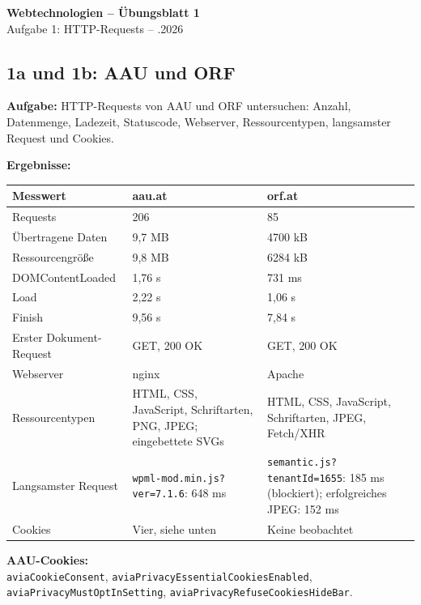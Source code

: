 \documentclass[10pt,a4paper]{article}
\begin{document}
\begin{center}
  {\Large\textbf{Webtechnologien -- Übungsblatt 1}}\\[4pt]
  Aufgabe 1: HTTP-Requests \quad -- .2026
\end{center}

\subsection*{1a und 1b: AAU und ORF}
\textbf{Aufgabe:} HTTP-Requests von AAU und ORF untersuchen:
Anzahl, Datenmenge, Ladezeit, Statuscode, Webserver, Ressourcentypen,
langsamster Request und Cookies.

\textbf{Ergebnisse:}

\begin{center}
\begin{tabular}{|p{4.1cm}|p{5.5cm}|p{5.5cm}|}
\hline
\textbf{Messwert} & \textbf{aau.at} & \textbf{orf.at} \\ \hline
Requests & 206 & 85 \\ \hline
Übertragene Daten & 9,7 MB & 4700 kB \\ \hline
Ressourcengröße & 9,8 MB & 6284 kB \\ \hline
DOMContentLoaded & 1,76 s & 731 ms \\ \hline
Load & 2,22 s & 1,06 s \\ \hline
Finish & 9,56 s & 7,84 s \\ \hline
Erster Dokument-Request & GET, 200 OK & GET, 200 OK \\ \hline
Webserver & nginx & Apache \\ \hline
Ressourcentypen & HTML, CSS, JavaScript, Schriftarten, PNG, JPEG; eingebettete SVGs & HTML, CSS, JavaScript, Schriftarten, JPEG, Fetch/XHR \\ \hline
Langsamster Request & \nolinkurl{wpml-mod.min.js?ver=7.1.6}: 648 ms & \nolinkurl{semantic.js?tenantId=1655}: 185 ms (blockiert); erfolgreiches JPEG: 152 ms \\ \hline
Cookies & Vier, siehe unten & Keine beobachtet \\ \hline
\end{tabular}
\end{center}

\textbf{AAU-Cookies:}\\
\texttt{aviaCookieConsent},
\texttt{aviaPrivacyEssentialCookiesEnabled},\\
\texttt{aviaPrivacyMustOptInSetting},
\texttt{aviaPrivacyRefuseCookiesHideBar}.
\end{document}

